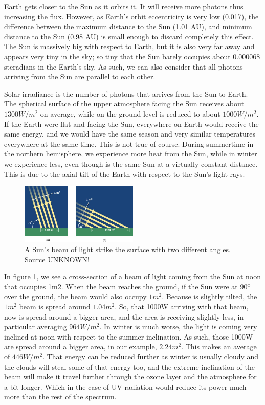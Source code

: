 Earth gets closer to the Sun as it orbits it. It will receive more photons thus increasing the flux. However, as Earth's orbit eccentricity is very low (0.017), the difference between the maximum distance to the Sun (1.01 AU), and minimum distance to the Sun (0.98 AU) is small enough to discard completely this effect. The Sun is massively big with respect to Earth, but it is also very far away and appears very tiny in the sky; so tiny that the Sun barely occupies about 0.000068 steradians in the Earth's sky. As such, we can also consider that all photons arriving from the Sun are parallel to each other.

Solar irradiance is the number of photons that arrives from the Sun to Earth. The spherical surface of the upper atmosphere facing the Sun receives about $1300 W/m^2$ on average, while on the ground level is reduced to about $1000W/m^2$. If the Earth were flat and facing the Sun, everywhere on Earth would receive the same energy, and we would have the same season and very similar temperatures everywhere at the same time. This is not true of course. During summertime in the northern hemisphere, we experience more heat from the Sun, while in winter we experience less, even though is the same Sun at a virtually constant distance. This is due to the axial tilt of the Earth with respect to the Sun's light rays. \vspace{1mm}

\begin{figure}[H]

    \centering
    \includegraphics[width=0.5\textwidth]{figures/Vitamin D/OSC_Astro_04_02_Sunray2.jpg}
    \caption{A Sun's beam of light strike the surface with two different angles. Source UNKNOWN!}
    \label{fig:rayTilt}

\end{figure}


In figure \ref{fig:rayTilt}, we see a cross-section of a beam of light coming from the Sun at noon that occupies 1m2. When the beam reaches the ground, if the Sun were at 90º over the ground, the beam would also occupy $1m^2$. Because is slightly tilted, the $1m^2$ beam is spread around $1.04m^2$. So, that 1000W arriving with that beam, now is spread around a bigger area, and the area is receiving slightly less, in particular averaging $964W/m^2$. In winter is much worse, the light is coming very inclined at noon with respect to the summer inclination. As such, those 1000W are spread around a bigger area, in our example, $2.24m^2$. This makes an average of $446W/m^2$. That energy can be reduced further as winter is usually cloudy and the clouds will steal some of that energy too, and the extreme inclination of the beam will make it travel further through the ozone layer and the atmosphere for a bit longer. Which in the case of UV radiation would reduce its power much more than the rest of the spectrum.


